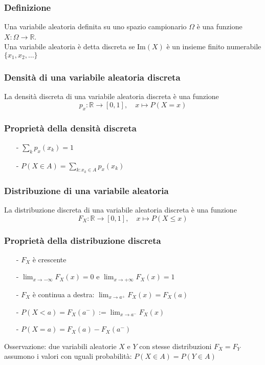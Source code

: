 \documentclass[a4paper]{article}
\newcommand\R{\mathbb{R}}     %
\begin{document}
\subsubsection*{Definizione}
Una variabile aleatoria definita su uno spazio campionario \(\Omega\) è una funzione \(X: \Omega \to \R\). \\
Una variabile aleatoria è detta discreta se \(\text{Im}(X)\) è un insieme finito numerabile \(\{x_1, x_2, \dots\}\)

\subsubsection*{Densità di una variabile aleatoria discreta}
La densità discreta di una variabile aleatoria discreta è una funzione \[p_x : \R \to [0,1], \quad x \mapsto P(X = x)\]

\subsubsection*{Proprietà della densità discreta}
\begin{itemize}[topsep=3pt, itemsep=0pt]
	\item[-] \(\displaystyle \sum_k p_x(x_k) = 1\)
	\item[-] \(\displaystyle P(X \in A) = \sum_{k : x_k \in A} p_x(x_k)\)
\end{itemize}

\subsubsection*{Distribuzione di una variabile aleatoria}
La distribuzione discreta di una variabile aleatoria discreta è una funzione \[F_X : \R \to [0,1], \quad x \mapsto P(X \leq x)\]

\subsubsection*{Proprietà della distribuzione discreta}
\begin{itemize}[topsep=3pt, itemsep=0pt]
	\item[-] \(F_X\) è crescente
	\item[-] \(\displaystyle \lim_{x \to -\infty} F_X(x) = 0\) e \(\displaystyle \lim_{x \to +\infty} F_X(x) = 1\)
	\item[-] \(F_X\) è continua a destra: \(\displaystyle \lim_{x \to a^+} F_X(x) = F_X(a)\)
	\item[-] \(P(X < a) = F_X(a^-) := \lim_{x \to a^-} F_X(x)\)
	\item[-] \(P(X = a) = F_X(a) - F_X(a^-)\)
\end{itemize}
Osservazione: due variabili aleatorie \(X\) e \(Y\) con stesse distribuzioni \(F_X = F_Y\) assumono i valori con uguali probabilità:
\(P(X \in A) = P(Y \in A)\)
\end{document}

